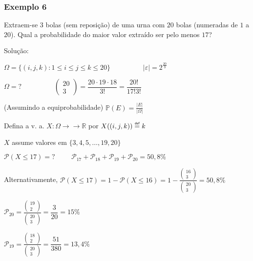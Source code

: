 \documentclass[a4paper]{article}
\newcommand\defeq{\mathrel{\overset{\makebox[0pt]{\mbox{\normalfont\tiny\sffamily def}}}{=}}}
\begin{document}
	\subsubsection{Exemplo 6}
	
	\noindent Extraem-se $3$ bolas (sem reposição) de uma urna com $20$ bolas (numeradas de $1$ a $20$). Qual a probabilidade do maior valor extraído ser pelo menos $17$?
	
	Solução:
	
	$\varOmega = \{(i,j,k): 1 \leq i \leq j \leq k \leq 20\} \hspace{2cm} |\varepsilon|= 2^{\frac{20}{3}}$
	
	$\varOmega = ? \hspace{2cm} \begin{pmatrix}
		20 \\
		3
	\end{pmatrix} = \dfrac{20 \cdot 19 \cdot 18}{3!} = \dfrac{20!}{17!3!}$
	
	(Assumindo a equiprobabilidade) \hspace{2cm} $\mathbb{P}(E) = \frac{|E|}{|\varOmega|}$
	
	Defina a v. a. $X: \varOmega \rightarrow \rightarrow \mathbb{R}$ por $X((i,j,k)) \defeq k$
	
	$X$ assume valores em $\{3,4,5,\dots,19,20\}$
	
	$\mathcal{P}(X \leq 17) = ? \hspace{1cm} \mathcal{P}_{17} + \mathcal{P}_{18} + \mathcal{P}_{19} + \mathcal{P}_{20} = 50,8\%$
	
	Alternativamente, $\mathcal{P}(X \leq 17) = 1-\mathcal{P}(X \leq 16) = 1 - \frac{\begin{pmatrix}
		16 \\
		3
		\end{pmatrix}}{\begin{pmatrix}
		20 \\
		3
		\end{pmatrix}} = 50,8\%$
	
	$\mathcal{P}_{20} = \frac{\begin{pmatrix}
		19 \\
		2
		\end{pmatrix}}{\begin{pmatrix}
		20 \\
		3
		\end{pmatrix}} = \dfrac{3}{20} = 15\%$
	
	$\mathcal{P}_{19} = \frac{\begin{pmatrix}
		18 \\
		2
		\end{pmatrix}}{\begin{pmatrix}
		20 \\
		3
		\end{pmatrix}} = \dfrac{51}{380} = 13,4\%$
	
\end{document}
